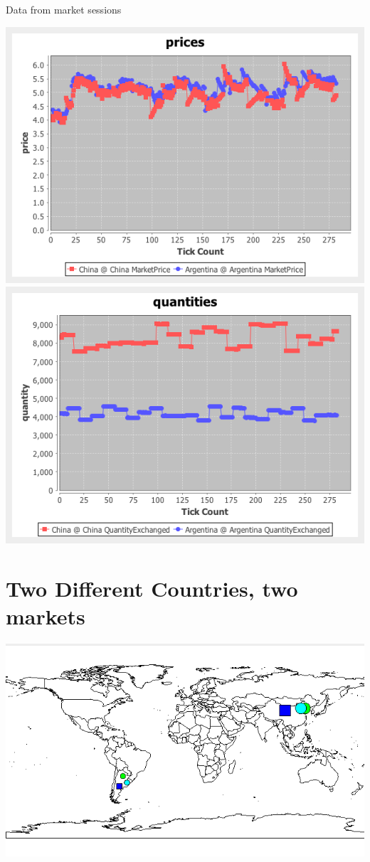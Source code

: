 \documentclass{article}
\begin{document}
\noindent Data from market sessions

\vskip2mm
\hskip-2cm
\includegraphics[scale=0.4]{fig_case7_prices}
\includegraphics[scale=0.4]{fig_case7_quantities}

\newpage

\section{Two Different Countries, two markets}

\includegraphics[scale=0.6]{fig_2_2_2_map}
\end{document}
